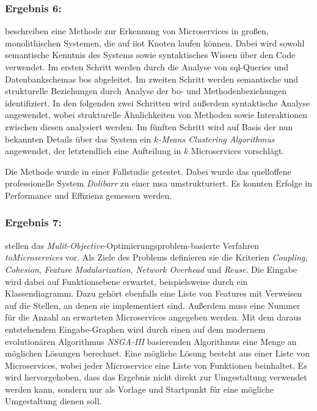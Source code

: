 
\subsubsection{Ergebnis 6:  \cite{arh-result-important-filter-4}}

\citeauthor{arh-result-important-filter-4} beschreiben eine Methode zur Erkennung von Microservices in großen, monolithischen Systemen, die auf \gls{iiot} Knoten laufen können.
Dabei wird sowohl semantische Kenntnis des Systems sowie syntaktisches Wissen über den Code verwendet.
Im ersten Schritt werden durch die Analyse von \gls{sql}-Queries und Datenbankschemas \glspl{bo} abgeleitet.
Im zweiten Schritt werden semantische und strukturelle Beziehungen durch Analyse der \gls{bo}- und Methodenbeziehungen identifiziert.
In den folgenden zwei Schritten wird außerdem syntaktische Analyse angewendet, wobei strukturelle Ähnlichkeiten von Methoden sowie Interaktionen zwischen diesen analysiert werden.
Im fünften Schritt wird auf Basis der nun bekannten Details über das System ein \emph{$k$-Means Clustering Algorithmus} angewendet, der letztendlich eine Aufteilung in $k$ Microservices vorschlägt.

Die Methode wurde in einer Fallstudie getestet.
Dabei wurde das quelloffene professionelle System \emph{Dolibarr} zu einer \gls{msa} umstrukturiert.
Es konnten Erfolge in Performance und Effizienz gemessen werden.

\subsubsection{Ergebnis 7:  \cite{arh-result-important-filter-7}}

\citeauthor{arh-result-important-filter-7} stellen das \emph{Mulit-Objective}-Optimierungsproblem-basierte Verfahren \emph{toMicroservices} vor.
Als Ziele des Problems definieren sie die Kriterien \emph{Coupling}, \emph{Cohesion}, \emph{Feature Modularization}, \emph{Network Overhead} und \emph{Reuse}.
Die Eingabe wird dabei auf Funktionsebene erwartet, beispielsweise durch ein Klassendiagramm.
Dazu gehört ebenfalls eine Liste von Features mit Verweisen auf die Stellen, an denen sie implementiert sind.
Außerdem muss eine Nummer für die Anzahl an erwarteten Microservices angegeben werden.
Mit dem daraus entstehendem Eingabe-Graphen wird durch einen auf dem modernem evolutionären Algorithmus \emph{NSGA-III} \cite{NSGA-III} basierenden Algorithmus eine Menge an möglichen Lösungen berechnet.
Eine mögliche Lösung besteht aus einer Liste von Microservices, wobei jeder Microservice eine Liste von Funktionen beinhaltet.
Es wird hervorgehoben, dass das Ergebnis nicht direkt zur Umgestaltung verwendet werden kann, sondern nur als Vorlage und Startpunkt für eine mögliche Umgestaltung dienen soll.
 
